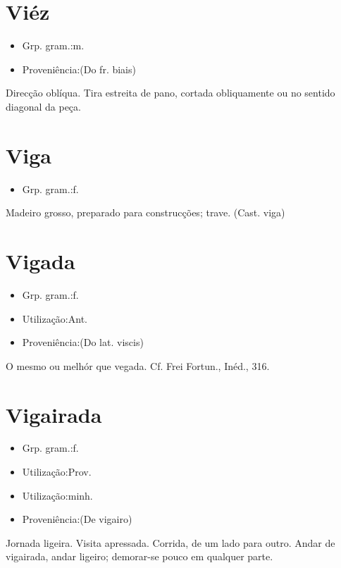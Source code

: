 \documentclass{article}
\begin{document}
\section{Viéz}
\begin{itemize}
\item {Grp. gram.:m.}
\end{itemize}
\begin{itemize}
\item {Proveniência:(Do fr. \textunderscore biais\textunderscore )}
\end{itemize}
Direcção oblíqua.
Tira estreita de pano, cortada obliquamente ou no sentido diagonal da peça.
\section{Viga}
\begin{itemize}
\item {Grp. gram.:f.}
\end{itemize}
Madeiro grosso, preparado para construcções; trave.
(Cast. \textunderscore viga\textunderscore )
\section{Vigada}
\begin{itemize}
\item {Grp. gram.:f.}
\end{itemize}
\begin{itemize}
\item {Utilização:Ant.}
\end{itemize}
\begin{itemize}
\item {Proveniência:(Do lat. \textunderscore viscis\textunderscore )}
\end{itemize}
O mesmo ou melhór que \textunderscore vegada\textunderscore . Cf. Frei Fortun., \textunderscore Inéd.\textunderscore , 316.
\section{Vigairada}
\begin{itemize}
\item {Grp. gram.:f.}
\end{itemize}
\begin{itemize}
\item {Utilização:Prov.}
\end{itemize}
\begin{itemize}
\item {Utilização:minh.}
\end{itemize}
\begin{itemize}
\item {Proveniência:(De \textunderscore vigairo\textunderscore )}
\end{itemize}
Jornada ligeira.
Visita apressada.
Corrida, de um lado para outro.
\textunderscore Andar de vigairada\textunderscore , andar ligeiro; demorar-se pouco em qualquer parte.
\end{document}
